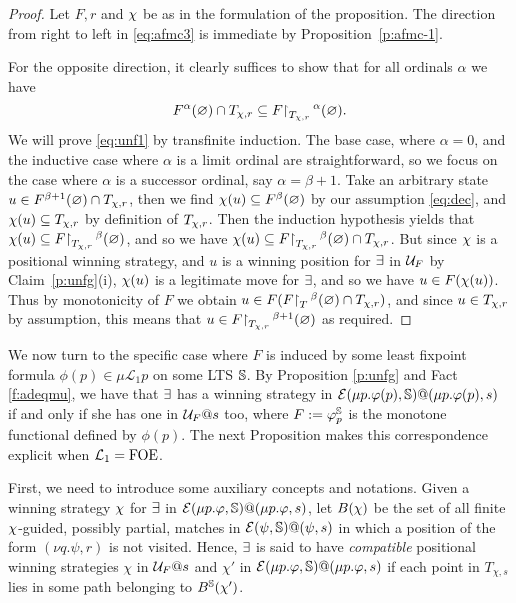 \begin{proof}
Let $F,r$ and $\chi$ be as in the formulation of the proposition.
The direction from right to left in \eqref{eq:afmc3} is immediate by
Proposition~\ref{p:afmc-1}.

For the opposite direction, it clearly suffices to show that for all ordinals 
$\alpha$ we have
\begin{equation}
\label{eq:unf1}
F^{\al}(\nada) \cap T_{\ystrat,r} \sse F\rst{T_{\ystrat,r}}^{\alpha}(\nada).
\end{equation}
We will prove \eqref{eq:unf1} by transfinite induction.
The base case, where $\alpha = 0$, and the inductive case where $\alpha$ is a 
limit ordinal are straightforward, so we focus on the case where $\alpha$ is a 
successor ordinal, say $\alpha = \beta +1$.
Take an arbitrary state $u \in F^{\beta+1}(\varnothing) \cap T_{\chi,r}$, then we 
find $\chi(u) \subseteq F^{\beta}(\varnothing)$ by our assumption \eqref{eq:dec}, and 
$\chi(u) \subseteq T_{\chi,r}$ by definition of $T_{\chi,r}$.
Then the induction hypothesis yields that 
$\chi(u) \subseteq F{\upharpoonright}_{T_{\chi,r}}\,^{\beta}(\varnothing)$, and so we have 
$\chi(u) \subseteq F{\upharpoonright}_{T_{\chi,r}}\,^{\beta}(\varnothing) \cap T_{\chi,r}$.
But since $\chi$ is a positional winning strategy, and $u$ is a winning 
position for $\exists$ in $\mathcal{U}_{F}$ by Claim~\ref{p:unfg}(i), $\chi(u)$ is a
legitimate move for $\exists$, and so we have $u \in F(\chi(u))$.
Thus by monotonicity of $F$ we obtain $u \in 
F(F{\upharpoonright}_{T}\,^{\beta}(\varnothing) \cap T_{\chi,r})$, and since $u \in T_{\chi,r}$ 
by assumption, this means that $u \in F{\upharpoonright}_{T_{\chi,r}}\,^{\beta+1}(\varnothing)$ as 
required.
\end{proof}







We now turn to the specific case where $F$ is induced by some least fixpoint 
formula $\phi(p) \in \mu\mathcal{L}_1{p}$ on some LTS $\mathbb{S}$.   By Proposition \ref{p:unfg} and Fact  \ref{f:adeqmu}, we have that $\exists$ has a winning strategy in  $\mathcal{E}(\mu p.\varphi(p),\mathbb{S})@(\mu p.\varphi(p),s)$ if and only if she has one in $\mathcal{U}_{F}@s$ too, where $F := \varphi_{p}^{\mathbb{S}}$ is the monotone functional defined by $\phi(p)$. The next Proposition  makes this correspondence explicit when $\mathcal{L}_1=\mathrm{FOE}$. 

First, we need to introduce some auxiliary concepts and notations.
Given  a winning strategy   $\chi$ for $\exists$ in $\mathcal{E}(\mu p. \varphi,\mathbb{S})@(\mu p. \varphi,s)$, 
let $B(\chi)$ be the set of all finite $\chi$-guided, possibly partial, matches in  $\mathcal{E}(\psi,\mathbb{S})@(\psi,s)$ in which a position of the form $(\nu q. \psi, r)$ is not visited. 
Hence, $\exists$ is said to have \emph{compatible} positional winning strategies $\chi$ in $\mathcal{U}_F@s$ and  $\chi'$  in $\mathcal{E}(\mu p.\varphi,\mathbb{S})@(\mu p.\varphi,s)$ if each point in $T_{\chi,s}$ lies in some path belonging to $B^{\mathbb{S}}(\chi')$. 

